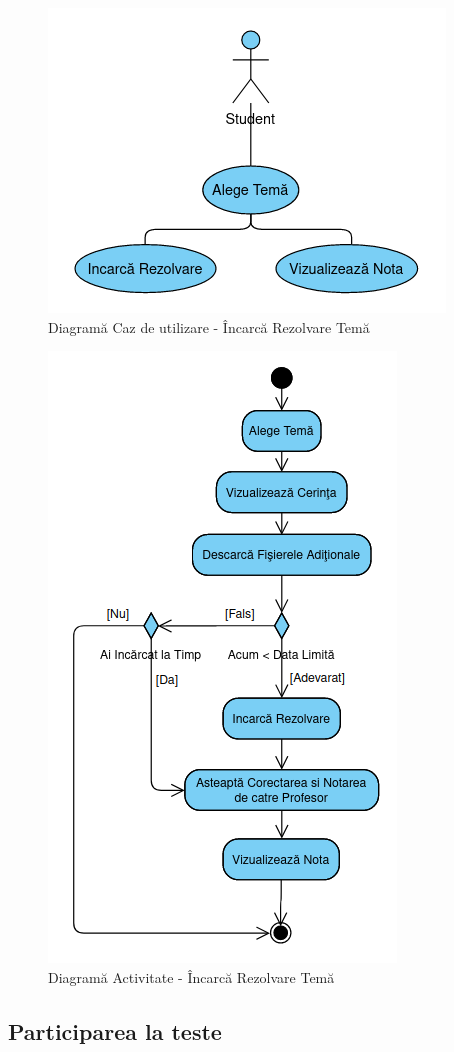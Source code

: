 \documentclass[12pt, a4paper, oneside, romanian]{teza-upb}
\begin{document}
\begin{figure}[H]
\centering
\includegraphics*[width=0.5\columnwidth]{diagrama-use-case-incarca-rezolvare-tema}
\caption{Diagramă Caz de utilizare - Încarcă Rezolvare Temă}
\label{diagrama-use-case-incarca-rezolvare-tema}
\end{figure}


\begin{figure}[H]
\centering
\includegraphics*[width=0.55\columnwidth]{diagrama-activitate-incarca-rezolvare-tema}
\caption{Diagramă Activitate - Încarcă Rezolvare Temă}
\label{diagrama-activitate-incarca-rezolvare-tema}
\end{figure}


\subsection{Participarea la teste}
\end{document}
